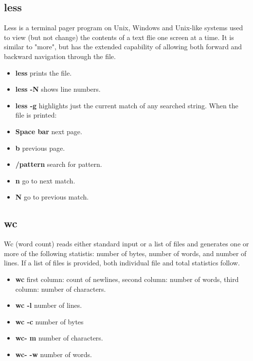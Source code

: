 \documentclass[10pt,a4paper]{scrartcl}
\begin{document}
\begin{description}
\subsection{less}
\begin{singlespacing}
Less is a terminal pager program on Unix, Windows and Unix-like systems used to view (but not change) the contents of a text flie one screen at a time. It is similar to "more", but has the extended capability of allowing both forward and backward navigation through the file.
\end{singlespacing}
\begin{doublespacing}
\begin{itemize}
\item{\bf{less}}  \qquad prints the file.
\item{\bf{less -N}}  \qquad shows line numbers.
\item{\bf{less -g}}   \qquad   highlights just the current match of any searched string.
When the file is printed:
\item{\bf{Space bar}} \qquad next page.
\item{\bf{b}} \qquad previous page.
\item{\bf{/pattern}} search for pattern.
\item{\bf{n}} go to next match.
\item{\bf{N}} go to previous match.
\end{itemize}
\end{doublespacing}

\subsection{wc}
\begin{singlespacing}
Wc (word count) reads either standard input or a list of files and generates one or more of the following statistis: number of bytes, number of words, and number of lines. If a list of files is provided, both individual file and total statistics follow.
\end{singlespacing}
\begin{doublespacing}
\begin{itemize}
\item{\bf{wc}} \qquad first column: count of newlines, second column: number of words, third column: number of characters.
\item{\bf{wc -l}} \qquad number of lines.
\item{\bf{wc -c}} \qquad number of bytes
\item{\bf{wc- m}} \qquad number of characters.
\item{\bf{wc- -w}} \qquad number of words.
\end{itemize}
\end{doublespacing}

\end{description}
\end{document}
